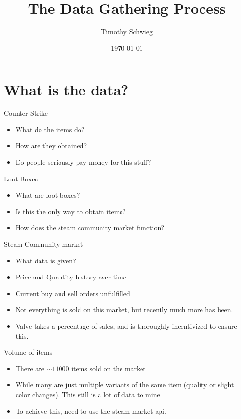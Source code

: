\documentclass[bigger]{beamer}
\author{Timothy Schwieg}
\date{\today}
\title{The Data Gathering Process}
\begin{document}
\maketitle

\section{What is the data?}
\label{sec-1}

\begin{frame}[label=sec-1-1]{Counter-Strike}
\begin{itemize}
\item What do the items do?
\item How are they obtained?
\item Do people seriously pay money for this stuff?
\end{itemize}
\end{frame}

\begin{frame}[label=sec-1-2]{Loot Boxes}
\begin{itemize}
\item What are loot boxes?
\item Is this the only way to obtain items?
\item How does the steam community market function?
\end{itemize}
\end{frame}

\begin{frame}[label=sec-1-3]{Steam Community market}
\begin{itemize}
\item What data is given?
\item Price and Quantity history over time
\item Current buy and sell orders unfulfilled
\item Not everything is sold on this market, but recently much more has
been.
\item Valve takes a percentage of sales, and is thoroughly incentivized to
ensure this.
\end{itemize}
\end{frame}

\begin{frame}[label=sec-1-4]{Volume of items}
\begin{itemize}
\item There are $\sim 11000$ items sold on the market
\item While many are just multiple variants of the same item (quality or
slight color changes). This still is a lot of data to mine.
\item To achieve this, need to use the steam market api.
\end{itemize}
\end{frame}
\end{document}
